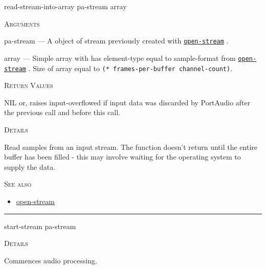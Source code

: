 \documentclass[a4paper]{report}
\begin{document}
    \label{portaudio__fun__read-stream-into-array}
    \begin{defun}[Function]
    read-stream-into-array pa-stream array


    
    \bigskip
    \textsc{Arguments}

pa-stream
	--- A object of stream previously created with \hyperref[portaudio__fun__open-stream]{\texttt{open-stream}}
  .

array
	--- Simple array with has element-type equal to sample-format from \hyperref[portaudio__fun__open-stream]{\texttt{open-stream}}
  . Size of array equal to \texttt{(* frames-per-buffer channel-count)}.




    
    \bigskip
    \textsc{Return Values}


NIL or, raises input-overflowed if input data was discarded by PortAudio after the previous call and before this call. 


	
    \bigskip
    \textsc{Details}

Read samples from an input stream. The function doesn't return until the entire buffer has been filled - this may involve waiting for the operating system to supply the data. 






      
    \bigskip
    \textsc{See also}


	
    \begin{itemize}
    
	  
    \item
    \hyperref[portaudio__fun__open-stream]{open-stream}
    
	
    \end{itemize}
  
      


    
    \end{defun}
  
  

    \rule{\linewidth}{0.1mm}
    
    \label{portaudio__fun__start-stream}
    \begin{defun}[Function]
    start-stream pa-stream


	
    \bigskip
    \textsc{Details}

Commences audio processing.


    
    \end{defun}
  
\end{document}
